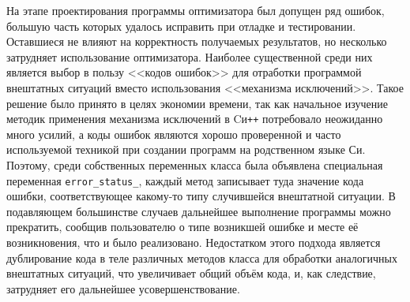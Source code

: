 На этапе проектирования программы оптимизатора был допущен ряд ошибок,
большую часть которых удалось исправить при отладке и
тестировании. Оставшиеся не влияют на корректность получаемых
результатов, но несколько затрудняет использование оптимизатора.
Наиболее существенной среди них является выбор в пользу <<кодов
ошибок>> для отработки программой внештатных ситуаций вместо
использования <<механизма исключений>>.  Такое решение было принято в
целях экономии времени, так как начальное изучение методик применения
механизма исключений в Cи\texttt{++} потребовало неожиданно много
усилий, а коды ошибок являются хорошо проверенной и часто используемой
техникой при создании программ на родственном языке Си. Поэтому, среди
собственных переменных класса была объявлена специальная переменная
\verb+error_status_+, каждый метод записывает туда
значение кода ошибки, соответствующее какому-то типу случившейся
внештатной ситуации.  В подавляющем большинстве случаев дальнейшее
выполнение программы можно прекратить, сообщив пользователю о типе
возникшей ошибке и месте её возникновения, что и было
реализовано. Недостатком этого подхода является дублирование кода в
теле различных методов класса для обработки аналогичных внештатных
ситуаций, что увеличивает общий объём кода, и, как следствие,
затрудняет его дальнейшее усовершенствование.

